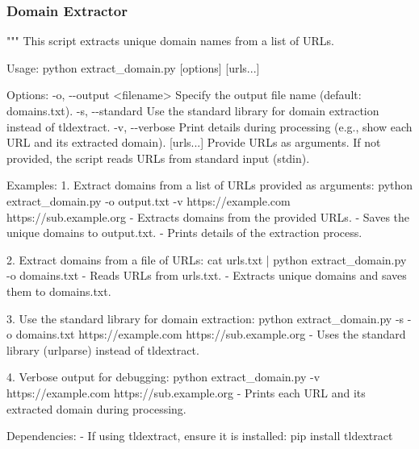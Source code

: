 \documentclass[
  titlepage]{article}
\newenvironment{Shaded}{\begin{snugshade}}{\end{snugshade}}
\newcommand{\CommentTok}[1]{\textcolor[rgb]{0.37,0.37,0.37}{#1}}
\begin{document}
\subsubsection{Domain Extractor}\label{domain-extractor}

\begin{Shaded}
\begin{Highlighting}[]
\CommentTok{"""}
\CommentTok{This script extracts unique domain names from a list of URLs.}

\CommentTok{Usage:}
\CommentTok{    python extract\_domain.py [options] [urls...]}

\CommentTok{Options:}
\CommentTok{    {-}o, {-}{-}output \textless{}filename\textgreater{}   Specify the output file name (default: domains.txt).}
\CommentTok{    {-}s, {-}{-}standard            Use the standard library for domain extraction instead of tldextract.}
\CommentTok{    {-}v, {-}{-}verbose             Print details during processing (e.g., show each URL and its extracted domain).}
\CommentTok{    [urls...]                 Provide URLs as arguments. If not provided, the script reads URLs from standard input (stdin).}

\CommentTok{Examples:}
\CommentTok{1. Extract domains from a list of URLs provided as arguments:}
\CommentTok{    python extract\_domain.py {-}o output.txt {-}v https://example.com https://sub.example.org}
\CommentTok{    {-} Extracts domains from the provided URLs.}
\CommentTok{    {-} Saves the unique domains to output.txt.}
\CommentTok{    {-} Prints details of the extraction process.}

\CommentTok{2. Extract domains from a file of URLs:}
\CommentTok{    cat urls.txt | python extract\_domain.py {-}o domains.txt}
\CommentTok{    {-} Reads URLs from urls.txt.}
\CommentTok{    {-} Extracts unique domains and saves them to domains.txt.}

\CommentTok{3. Use the standard library for domain extraction:}
\CommentTok{    python extract\_domain.py {-}s {-}o domains.txt https://example.com https://sub.example.org}
\CommentTok{    {-} Uses the standard library (urlparse) instead of tldextract.}

\CommentTok{4. Verbose output for debugging:}
\CommentTok{    python extract\_domain.py {-}v https://example.com https://sub.example.org}
\CommentTok{    {-} Prints each URL and its extracted domain during processing.}

\CommentTok{Dependencies:}
\CommentTok{{-} If using tldextract, ensure it is installed:}
\CommentTok{    pip install tldextract}


\end{Highlighting}
\end{Shaded}
\end{document}
